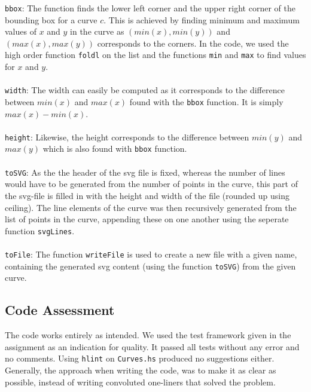 \documentclass[a4paper]{article}
\begin{document}
\texttt{bbox}: The function finds the lower left corner and the upper right corner of the bounding box for a curve $c$. This is achieved by finding minimum and maximum values of $x$ and $y$ in the curve as $(min(x), min(y))$ and $(max(x), max(y))$ corresponds to the corners. In the code, we used the high order function \texttt{foldl} on the list and the functions \texttt{min} and \texttt{max} to find values for $x$ and $y$. \\
\\
\texttt{width}: The width can easily be computed as it corresponds to the difference between $min(x)$ and $max(x)$ found with the \texttt{bbox} function. It is simply $max(x)-min(x)$. \\
\\
\texttt{height}: Likewise, the height corresponds to the difference between $min(y)$ and $max(y)$ which is also found with \texttt{bbox} function. \\
\\
\texttt{toSVG}:
As the the header of the svg file is fixed, whereas the number of lines would have to be generated
from the number of points in the curve, this part of the svg-file is filled in with the height and
width of the file (rounded up using ceiling).
The line elements of the curve was then recursively generated from the list of points in the curve, appending these on one another using the seperate function \texttt{svgLines}. \\
\\
\texttt{toFile}:
The function \texttt{writeFile} is used to create a new file with a given name, containing the generated
svg content (using the function \texttt{toSVG}) from the given curve.

\subsection*{Code Assessment}
The code works entirely as intended. We used the test framework given in the assignment as an indication for quality. It passed all tests without any error and no comments. Using \texttt{hlint} on \texttt{Curves.hs} produced no suggestions either. \\
Generally, the approach when writing the code, was to make it as clear as possible, instead of writing convoluted one-liners that solved the problem.
\end{document}
